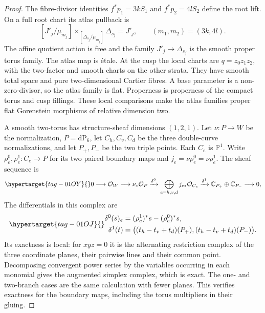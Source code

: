 \begin{proof}
The fibre-divisor identities $f^*p_1=3kS_1$ and $f^*p_2=4lS_2$
define the root lift. On a full root chart its atlas pullback is
\[
 [J'_j/\mu_{m_j}]
 \mathbin{\times_{[\Delta_{s_j}/\mu_{m_j}]}}
 \Delta_{s_j}=J'_j,
 \qquad (m_1,m_2)=(3k,4l).
\]
The affine quotient action is free and the family $J'_j\to\Delta_{s_j}$
is the smooth proper torus family. The atlas map is \'etale.
At the cusp the local charts are $q=z_0z_1z_2$, with the
two-factor and smooth charts on the other strata. They have smooth
total space and pure two-dimensional Cartier fibres. A base parameter
is a non-zero-divisor, so the atlas family is flat. Properness is
properness of the compact torus and cusp fillings. These local
comparisons make the atlas families proper flat Gorenstein morphisms
of relative dimension two.

A smooth two-torus has structure-sheaf dimensions $(1,2,1)$.
Let $\nu:P\to W$ be the normalization, $P=\mathrm{dP}_6$, let
$C_h,C_v,C_d$ be the three double-curve normalizations, and let
$P_+,P_-$ be the two triple points. Each $C_e$ is $\mathbb P^1$.
Write $\rho_e^0,\rho_e^1:C_e\to P$ for its two paired boundary maps
and $j_e=\nu\rho_e^0=\nu\rho_e^1$. The sheaf sequence is
\begin{equation}\hypertarget{tag-01OY}{}\label{fam:eq:ab-cusp-resolution}
 0\longrightarrow\mathcal O_W\longrightarrow\nu_*\mathcal O_P
 \xrightarrow{\delta^0}\bigoplus_{e=h,v,d}j_{e*}\mathcal O_{C_e}
 \xrightarrow{\delta^1}\mathbb C_{P_+}\oplus\mathbb C_{P_-}
 \longrightarrow0,
\end{equation}
The differentials in this complex are
\begin{equation}\hypertarget{tag-01OJ}{}\label{eq:P5normalization}
\begin{aligned}
 \delta^0(s)_e&=(\rho_e^1)^*s-(\rho_e^0)^*s,\\
 \delta^1(t)&=\bigl((t_h-t_v+t_d)(P_+),
                        (t_h-t_v+t_d)(P_-)\bigr).
\end{aligned}
\end{equation}
Its exactness is local: for $xyz=0$ it is the alternating restriction
complex of the three coordinate planes, their pairwise lines and their
common point. Decomposing convergent power series by the variables
occurring in each monomial gives the augmented simplex complex, which
is exact. The one- and two-branch cases are the same calculation with
fewer planes. This verifies exactness for the boundary maps,
including the torus multipliers in their gluing.


\end{proof}
